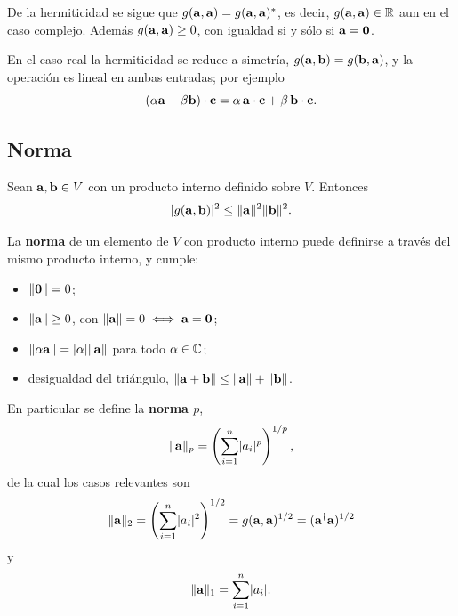 \begin{observacion}
  De la hermiticidad se sigue que $g(\mathbf{a},\mathbf{a})=g(\mathbf{a},\mathbf{a})^{*}$, es
  decir, $g(\mathbf{a},\mathbf{a})\in\mathbb{R}$ aun en el caso complejo. Adem\'as
  $g(\mathbf{a},\mathbf{a})\ge 0$, con igualdad si y s\'olo si $\mathbf{a}=\mathbf{0}$.
\end{observacion}

En el caso real la hermiticidad se reduce a simetr\'ia,
$g(\mathbf{a},\mathbf{b})=g(\mathbf{b},\mathbf{a})$, y la operaci\'on es lineal en ambas
entradas; por ejemplo
\begin{equation}
  \label{eq:bilineal_real}
  (\alpha\mathbf{a}+\beta\mathbf{b})\cdot\mathbf{c}
    =\alpha\,\mathbf{a}\cdot\mathbf{c}+\beta\,\mathbf{b}\cdot\mathbf{c}.
\end{equation}

\subsection{Norma}
\label{subsec:norma}

\begin{teorema}
  \label{teo:schwarz}
  Sean $\mathbf{a},\mathbf{b}\in V$ con un producto interno definido sobre $V$.
  Entonces
  \begin{equation}
    \label{eq:schwarz}
    \lvert g(\mathbf{a},\mathbf{b}) \rvert^2\le\lVert \mathbf{a} \rVert^2\lVert \mathbf{b} \rVert^2 .
  \end{equation}
\end{teorema}

\begin{definicion}[Norma]
  \label{def:norma}
  La \textbf{norma} de un elemento de $V$ con producto interno puede definirse a
  trav\'es del mismo producto interno, y cumple:
  \begin{itemize}
    \item $\lVert \mathbf{0} \rVert=0$;
    \item $\lVert \mathbf{a} \rVert\ge 0$, con $\lVert \mathbf{a} \rVert=0\iff\mathbf{a}=\mathbf{0}$;
    \item $\lVert \alpha\mathbf{a} \rVert=\lvert \alpha \rvert\lVert \mathbf{a} \rVert$ para todo $\alpha\in\mathbb{C}$;
    \item desigualdad del tri\'angulo,
          $\lVert \mathbf{a}+\mathbf{b} \rVert\le\lVert \mathbf{a} \rVert+\lVert \mathbf{b} \rVert$.
  \end{itemize}
\end{definicion}

En particular se define la \textbf{norma $p$},
\begin{equation}
  \label{eq:norma_p}
  \lVert \mathbf{a} \rVert_p=\left( \sum_{i=1}^{n}\lvert a_i \rvert^{p} \right)^{1/p},
\end{equation}
de la cual los casos relevantes son
\begin{equation}
  \label{eq:norma_2}
  \lVert \mathbf{a} \rVert_2=\left( \sum_{i=1}^{n}\lvert a_i \rvert^{2} \right)^{1/2}
    =g(\mathbf{a},\mathbf{a})^{1/2}=(\mathbf{a}^\dagger\mathbf{a})^{1/2}
\end{equation}
y
\begin{equation}
  \label{eq:norma_1}
  \lVert \mathbf{a} \rVert_1=\sum_{i=1}^{n}\lvert a_i \rvert.
\end{equation}

